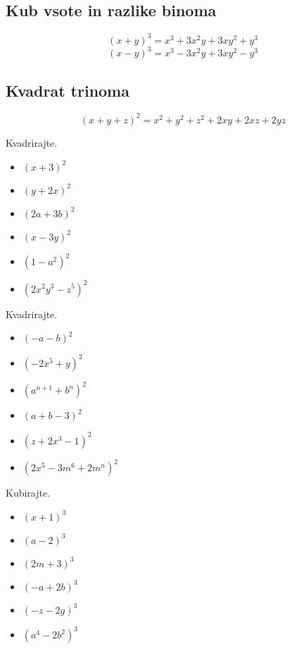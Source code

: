         
                \subsection*{Kub vsote in razlike binoma}
                    $$ (x+y)^3=x^3+3x^2y+3xy^2+y^3 $$
                    $$ (x-y)^3=x^3-3x^2y+3xy^2-y^3 $$
                
        
                \subsection*{Kvadrat trinoma}
                    $$ (x+y+z)^2=x^2+y^2+z^2+2xy+2xz+2yz $$
                
            
        
                \begin{naloga}
                    Kvadrirajte.
                    \begin{itemize}
                        \item $(x+3)^2$ 
                        \item $(y+2x)^2$ 
                        \item $(2a+3b)^2$ 
                        \item $(x-3y)^2$ 
                        \item $(1-a^2)^2$ 
                        \item $(2x^2y^3-z^5)^2$ 
                    \end{itemize}
                \end{naloga}


                \begin{naloga}
                    Kvadrirajte.
                    \begin{itemize}
                        \item $(-a-b)^2$ 
                        \item $(-2x^5+y)^2$ 
                        \item $(a^{n+1}+b^n)^2$ 
                        \item $(a+b-3)^2$ 
                        \item $(z+2x^3-1)^2$ 
                        \item $(2x^5-3m^6+2m^n)^2$ 
                    \end{itemize}
                \end{naloga}


                \begin{naloga}
                    Kubirajte.
                    \begin{itemize}
                        \item $(x+1)^3$ 
                        \item $(a-2)^3$ 
                        \item $(2m+3)^3$ 
                        \item $(-a+2b)^3$ 
                        \item $(-z-2g)^3$ 
                        \item $(a^4-2b^2)^3$ 
                    \end{itemize}
                \end{naloga}



